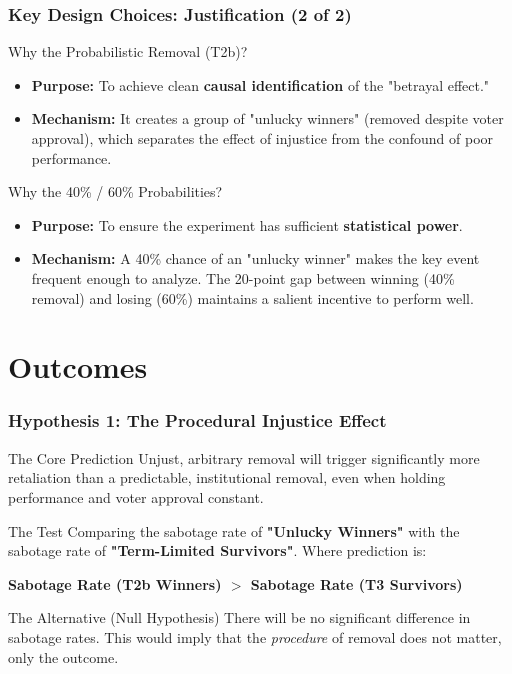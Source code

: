 \documentclass[10pt]{beamer}
\begin{document}
\begin{frame}
  \frametitle{Key Design Choices: Justification (2 of 2)}
  
  \begin{block}{Why the Probabilistic Removal (T2b)?}
    \begin{itemize}
        \item \textbf{Purpose:} To achieve clean \textbf{causal identification} of the "betrayal effect."
        \item \textbf{Mechanism:} It creates a group of "unlucky winners" (removed despite voter approval), which separates the effect of injustice from the confound of poor performance.
    \end{itemize}
  \end{block}
  
  \begin{block}{Why the 40\% / 60\% Probabilities?}
    \begin{itemize}
        \item \textbf{Purpose:} To ensure the experiment has sufficient \textbf{statistical power}.
        \item \textbf{Mechanism:} A 40\% chance of an "unlucky winner" makes the key event frequent enough to analyze. The 20-point gap between winning (40\% removal) and losing (60\%) maintains a salient incentive to perform well.
    \end{itemize}
  \end{block}
\end{frame}



\section{Outcomes}

\begin{frame}
  \frametitle{Hypothesis 1: The Procedural Injustice Effect}
  
  \begin{block}{The Core Prediction}
    Unjust, arbitrary removal will trigger significantly more retaliation than a predictable, institutional removal, even when holding performance and voter approval constant.
  \end{block}
  
  \begin{block}{The Test}
    Comparing the sabotage rate of \textbf{"Unlucky Winners"} with the sabotage rate of \textbf{"Term-Limited Survivors"}. Where prediction is:
    \begin{center}
        \textbf{Sabotage Rate (T2b Winners) $>$ Sabotage Rate (T3 Survivors)}
    \end{center}
  \end{block}
  
  \begin{block}{The Alternative (Null Hypothesis)}
    There will be no significant difference in sabotage rates. This would imply that the \textit{procedure} of removal does not matter, only the outcome.
  \end{block}
\end{frame}
\end{document}
